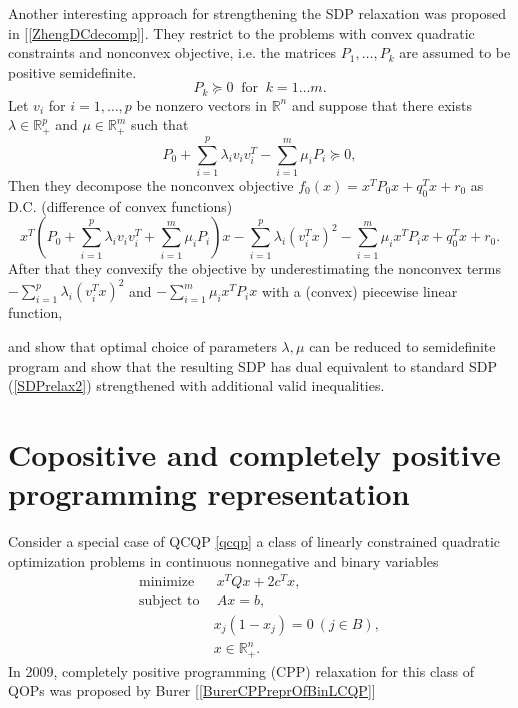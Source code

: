 \documentclass[12pt]{book}
\theoremstyle{definition}
\begin{document}
Another interesting approach for strengthening the SDP relaxation was proposed in [\ref{ZhengDCdecomp}]. 
They restrict to the problems with convex quadratic constraints and nonconvex objective, i.e. the matrices $P_1,\dots, P_k$ are assumed to be positive semidefinite. 
\begin{equation}
P_k\succeq 0 \ \mbox{ for }\  k = 1\dots m. 
\end{equation} 
Let $v_i$ for $i=1,\dots ,p$ be nonzero vectors in $\mathbb{R}^n$ and suppose that there exists $\lambda \in \mathbb{R}^p_+$ and $\mu \in \mathbb{R}^m_+$ such that 
\begin{equation}
P_0 + \sum_{i = 1}^p\lambda_i v_iv_i^T  - \sum_{i = 1}^m \mu_i P_i \succeq 0,
\end{equation}
Then they decompose the nonconvex objective $f_0(x) = x^TP_0x + q_0^Tx + r_0 $ as D.C. (difference of convex functions) 
\begin{equation}
x^T\left( P_0 + \sum_{i = 1}^p\lambda_i v_iv_i^T  + \sum_{i = 1}^m \mu_i P_i\right)x  - \sum_{i = 1}^p\lambda_i (v_i^Tx)^2  - \sum_{i = 1}^m \mu_i x^TP_ix + q_0^Tx + r_0.
\end{equation}
After that they convexify the objective by underestimating the nonconvex terms $-\sum_{i = 1}^p\lambda_i (v_i^Tx)^2$ and  $ - \sum_{i = 1}^m \mu_i x^TP_ix$ with a (convex) piecewise linear function, 


and show that optimal choice of parameters $\lambda, \mu$ can be reduced to semidefinite program and show that the resulting SDP has dual equivalent to 
standard SDP (\ref{SDPrelax2}) strengthened with additional valid inequalities.



\section{Copositive and completely positive programming representation}

Consider a special case of QCQP {\ref{qcqp}} a class of linearly constrained quadratic optimization problems in continuous nonnegative and binary variables
\begin{equation}
\label{BinaryQP}
\begin{array}{ll}
\mbox{minimize}&\ \ x^TQx + 2c^Tx ,\\
\mbox{subject to}&\ \ Ax = b,\\
				 & \ x_j(1-x_j) = 0 \ (j \in B), \\
				 &\ x\in \mathbb{R}^n_+. 
\end{array}
\end{equation}
In 	2009, completely positive programming (CPP) relaxation for this class of QOPs was proposed
by Burer [\ref{BurerCPPreprOfBinLCQP}] 
\end{document}

